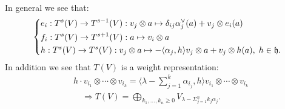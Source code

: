 \begin{itemize}
\begin{equation}
\begin{split}
        \end{split}
    \end{equation}
    In general we see that:
    \begin{equation}
        \left\{\begin{aligned}
            &e_i: T^s(V) \to T^{s-1}(V): v_j\otimes a\mapsto \delta_{ij}\alpha^{\vee}_j(a)+v_j\otimes e_i(a)\\
            &f_i: T^s(V) \to T^{s+1}(V): a\mapsto v_i\otimes a\\
            &h: T^s(V) \to T^s(V):v_j\otimes a \mapsto - \langle \alpha_j, h\rangle v_j\otimes a + v_j\otimes h(a),\;h\in\mathfrak{h}.
        \end{aligned}\right.
    \end{equation}
    In addition we see that $T(V)$ is a weight representation:
    \begin{equation}
        \begin{split}
    &h \cdot v_{i_1}\otimes\cdots\otimes v_{i_k}=\langle\lambda - \sum_{j=1}^k\alpha_{i_j}, h \rangle v_{i_1}\otimes\cdots\otimes v_{i_k}\\
    &\quad\Rightarrow T(V) = \bigoplus_{k_1,\dots,k_n\geq0} V_{\lambda - \Sigma_{j=1}^nk_j\alpha_j}.        
        \end{split}
    \end{equation}


\end{itemize}
